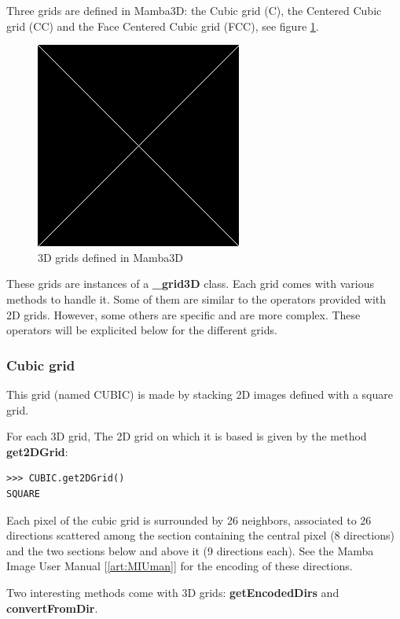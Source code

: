 \documentclass[a4paper,10pt,oneside]{article}
\begin{document}
Three grids are defined in Mamba3D: the Cubic grid (C), the Centered Cubic grid (CC) and the Face Centered Cubic grid (FCC),
see figure \ref{fig:3D_grids}.

\begin{figure}
\centering
\includegraphics[scale=0.3]{figures/xxx.png}
\caption{3D grids defined in Mamba3D}
\label{fig:3D_grids}
\end{figure}

These grids are instances of a \textbf{\_grid3D} class. Each grid comes with various methods to handle it. Some of them are similar to
the operators provided with 2D grids. However, some others are specific and are more complex. These operators will be explicited
below for the different grids.

\subsubsection{Cubic grid}
This grid (named CUBIC) is made by stacking 2D images defined with a square grid.

For each 3D grid, The 2D grid on which it is based is given by the method \textbf{get2DGrid}:

\lstset{language=Python}
\begin{lstlisting}
>>> CUBIC.get2DGrid()
SQUARE
\end{lstlisting}

Each pixel of the cubic grid is surrounded by 26 neighbors, associated to 26 directions scattered among the section containing the
central pixel (8 directions) and the two sections below and above it (9 directions each). See the Mamba Image User Manual [\ref{art:MIUman}]
for the encoding of these directions.

Two interesting methods come with 3D grids: \textbf{getEncodedDirs} and \textbf{convertFromDir}.
\end{document}
